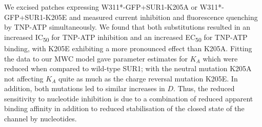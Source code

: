 We excised patches expressing W311*-GFP+SUR1-K205A or W311*-GFP+SUR1-K205E and measured current inhibition and fluorescence quenching by TNP-ATP simultaneously.
We found that both substitutions resulted in an increased IC\textsubscript{50} for TNP-ATP inhibition and an increased EC\textsubscript{50} for TNP-ATP binding, with K205E exhibiting a more pronounced effect than K205A.
Fitting the data to our MWC model gave parameter estimates for $K_A$ which were reduced when compared to wild-type SUR1; with the neutral mutation K205A not affecting $K_A$ quite as much as the charge reversal mutation K205E.
In addition, both mutations led to similar increases in $D$.
Thus, the reduced sensitivity to nucleotide inhibition is due to a combination of reduced apparent binding affinity in addition to reduced stabilisation of the closed state of the channel by nucleotides. 

